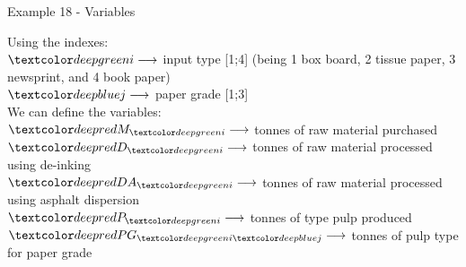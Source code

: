 \begin{frame}{Example 18 - Variables}

{\large Using the indexes:}
\vspace{3mm}\\
\small{
$\colorb{i} \longrightarrow$
    input type [1;4] (being 1 box board, 2 tissue paper, 3 newsprint, and 4 book paper) \\
$\colorc{j} \longrightarrow$
    paper grade [1;3]
}
\vspace{5mm}\\

{\large We can define the variables:}
\vspace{3mm}\\
\small{
$\colorsub{M}{i} \longrightarrow$
    tonnes of raw material  purchased \\
$\colorsub{D}{i} \longrightarrow$
    tonnes of raw material  processed using de-inking \\
$\colorsub{DA}{i} \longrightarrow$
    tonnes of raw material  processed using asphalt dispersion \\
$\colorsub{P}{i} \longrightarrow$
    tonnes of type  pulp produced \\
$\colorij{PG}{i}{j} \longrightarrow$
    tonnes of pulp type  for paper grade 
}

\end{frame}
